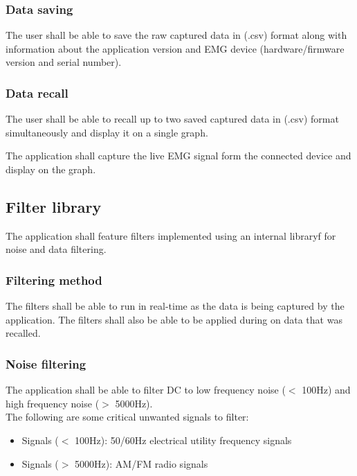 \documentclass[12pt,a4paper]{article}
\begin{document}
\subsubsection{Data saving}

The user shall be able to save the raw captured data in (.csv) format along with information about the application version and EMG device (hardware/firmware version and serial number).

\subsubsection{Data recall}

The user shall be able to recall up to two saved captured data in (.csv) format simultaneously and display it on a single graph.

The application shall capture the live EMG signal form the connected device and display on the graph.

\subsection{Filter library}

The application shall feature filters implemented using an internal libraryf for noise and data filtering.

\subsubsection{Filtering method}

The filters shall be able to run in real-time as the data is being captured by the application. 
The filters shall also be able to be applied during on data that was recalled.

\subsubsection{Noise filtering}

The application shall be able to filter DC to low frequency noise ($<$ 100Hz) and high frequency noise ($>$ 5000Hz). \\

The following are some critical unwanted signals to filter: 

\begin{itemize}
	\item Signals ($<$ 100Hz): 50/60Hz electrical utility frequency signals
	\item Signals ($>$ 5000Hz): AM/FM radio signals
\end{itemize}
\end{document}

